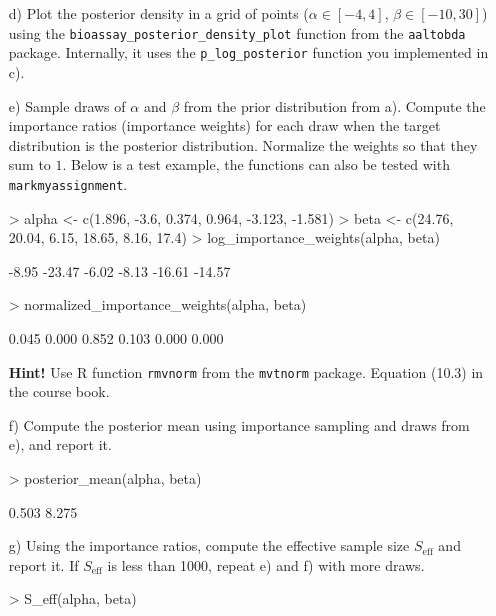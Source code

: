 \documentclass[11pt,a4paper,english]{article}
\begin{document}
\begin{enumerate}
\begin{itemize}
\item[d)] Plot the posterior density in a grid of points ($\alpha \in [-4,4]$, $\beta \in [-10,30]$) using the {\tt bioassay\_posterior\_density\_plot} function from the {\tt aaltobda} package. Internally, it uses the {\tt p\_log\_posterior} function you implemented in c).
\item[e)] Sample draws of $\alpha$ and $\beta$ from the prior distribution from a).  Compute the importance ratios (importance weights) for each draw when the target distribution is
the posterior distribution. Normalize the weights so that they sum to $1$. Below is a test example, the functions can also be tested with \texttt{markmyassignment}.\\
\begin{Schunk}
\begin{Sinput}
> alpha <- c(1.896, -3.6,  0.374, 0.964, -3.123, -1.581)
> beta <- c(24.76, 20.04, 6.15, 18.65, 8.16, 17.4)
> log_importance_weights(alpha, beta)
\end{Sinput}
\begin{Soutput}
[1]  -8.95 -23.47  -6.02  -8.13 -16.61 -14.57
\end{Soutput}
\begin{Sinput}
> normalized_importance_weights(alpha, beta)
\end{Sinput}
\begin{Soutput}
[1] 0.045 0.000 0.852 0.103 0.000 0.000
\end{Soutput}
\end{Schunk}
\textbf{Hint!} Use R function {\tt rmvnorm} from the {\tt mvtnorm} package. Equation (10.3) in the course book.
\item[f)] Compute the posterior mean using importance sampling and draws from e), and report it.
\begin{Schunk}
\begin{Sinput}
> posterior_mean(alpha, beta)
\end{Sinput}
\begin{Soutput}
[1] 0.503 8.275
\end{Soutput}
\end{Schunk}
\item[g)] Using the importance ratios, compute the effective sample size $S_{\text{eff}}$ and report it. If $S_{\text{eff}}$ is less than 1000, repeat e) and f) with more draws.\\
\begin{Schunk}
\begin{Sinput}
> S_eff(alpha, beta)
\end{Sinput}

\end{Schunk}
\end{itemize}
\end{enumerate}
\end{document}
